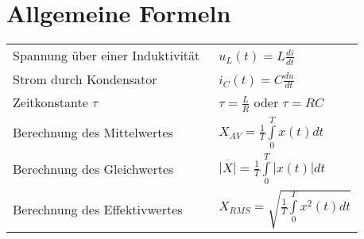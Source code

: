 \section{Allgemeine Formeln}

\begin{tabular}{ll}
  Spannung über einer Induktivität &\ $u_{L}(t) = L\frac{di}{dt}$\\
  Strom durch Kondensator &\ $i_{C}(t) = C\frac{du}{dt}$\\
  Zeitkonstante $\tau$ &\ $\tau = \frac{L}{R}$ oder $\tau = RC$\\
  Berechnung des Mittelwertes &\ $X_{AV} = \frac{1}{T}\int\limits_{0}^{T}x(t)dt$\\
  Berechnung des Gleichwertes &\ $\overline{|X|} = \frac{1}{T} \int\limits_{0}^{T} |x(t)|dt$\\
  Berechnung des Effektivwertes &\ $X_{RMS} = \sqrt{\frac{1}{T}\int\limits_{0}^{T}x^2(t)dt}$\\
\end{tabular}